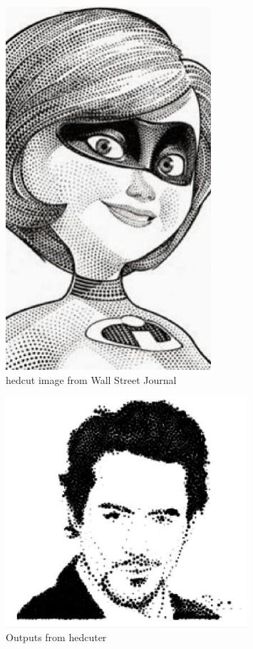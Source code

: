 \documentclass[11pt]{article}
\begin{document}
\begin{figure}[h!]
\centering
\includegraphics[width=3in]{figure11.eps}
\caption{hedcut image from Wall Street Journal}
\label{threadsVsSync}
\end{figure}
\begin{figure}[h!]
\centering
\includegraphics[width=0.80\textwidth]{figure12.eps}
\caption{Outputs from hedcuter}
\label{threadsVsSync}
\end{figure}
\end{document}
